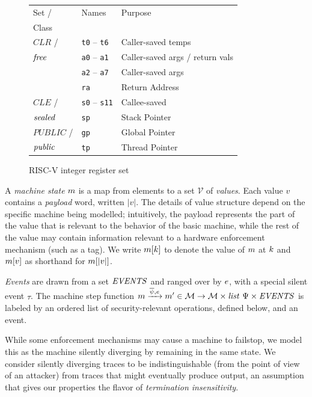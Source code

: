 \documentclass[10pt,conference]{ieeetran}%
\theoremstyle{definition}
\begin{document}
\begin{figure}
  \begin{tabular}{| l | l | l |}
    \hline
    Set / & Names & Purpose \\
    Class & & \\
    \hline
    \(\mathit{CLR}\) / & {\tt t0} -- {\tt t6} & Caller-saved temps \\
    \(\mathit{free}\) & {\tt a0} -- {\tt a1} & Caller-saved args / return vals \\
    & {\tt a2} -- {\tt a7} & Caller-saved args \\
    & {\tt ra} & Return Address \\
    \hline
    \(\mathit{CLE}\) / & {\tt s0} -- {\tt s11} & Callee-saved \\
    \(\mathit{sealed}\) & {\tt sp} & Stack Pointer \\  
    \hline
    \(\mathit{PUBLIC}\) / & {\tt gp} & Global Pointer  \\
    \(\mathit{public}\) & {\tt tp} & Thread Pointer \\
    \hline
  \end{tabular}
  \caption{RISC-V integer register set}
  \label{fig:RISCVregs}
\end{figure}

A {\em machine state} \(m\) is a map from elements to a set \(\mathcal{V}\) of
\emph{values}. Each value \(v\) contains a \emph{payload} word, written \(|v|\).
The details of value structure depend on the specific machine being modelled;  
intuitively, the payload represents the part of the value that is relevant to
the behavior of the basic machine, while the rest of the value may contain
information relevant to a hardware enforcement mechanism (such as a tag).
We write \(m[k]\) to denote the value of \(m\) at
\(k\)  and \(m[v]\) as shorthand for \(m[|v|]\). 

{\em Events} are drawn from a set \(\mathit{EVENTS}\) and ranged over by \(e\), with a
special silent event \(\tau\).
The machine step function
\(m \xrightarrow{\overline{\psi},e} m' \in {\mathcal M} \rightarrow
{\mathcal M} \times \mathit{list} ~ \Psi \times \mathit{EVENTS}\)
is labeled by an ordered list of security-relevant operations, defined below,
and an event.

While some enforcement mechanisms may cause a machine to
failstop, we model this as the machine silently diverging by remaining in the
same state. We consider silently diverging traces to be indistinguishable
(from the point of view of an attacker) from traces that might eventually
produce output, an assumption that gives our properties the flavor of
{\it termination insensitivity}.
\end{document}
